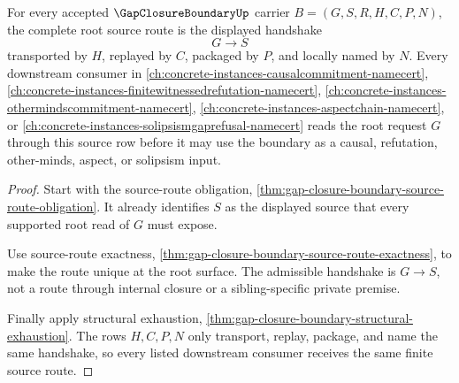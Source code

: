 \begin{theorem}
\label{thm:gap-closure-boundary-root-source-handshake}
For every accepted $\GapClosureBoundaryUp$ carrier $B=(G,S,R,H,C,P,N)$, the complete root source route is the displayed handshake
$$
G \longrightarrow S
$$
transported by $H$, replayed by $C$, packaged by $P$, and locally named by $N$. Every downstream consumer in \autoref{ch:concrete-instances-causalcommitment-namecert}, \autoref{ch:concrete-instances-finitewitnessedrefutation-namecert}, \autoref{ch:concrete-instances-othermindscommitment-namecert}, \autoref{ch:concrete-instances-aspectchain-namecert}, or \autoref{ch:concrete-instances-solipsismgaprefusal-namecert} reads the root request $G$ through this source row before it may use the boundary as a causal, refutation, other-minds, aspect, or solipsism input.
\end{theorem}
\begin{proof}
Start with the source-route obligation, \autoref{thm:gap-closure-boundary-source-route-obligation}. It already identifies $S$ as the displayed source that every supported root read of $G$ must expose.

Use source-route exactness, \autoref{thm:gap-closure-boundary-source-route-exactness}, to make the route unique at the root surface. The admissible handshake is $G \longrightarrow S$, not a route through internal closure or a sibling-specific private premise.

Finally apply structural exhaustion, \autoref{thm:gap-closure-boundary-structural-exhaustion}. The rows $H,C,P,N$ only transport, replay, package, and name the same handshake, so every listed downstream consumer receives the same finite source route.
\end{proof}

